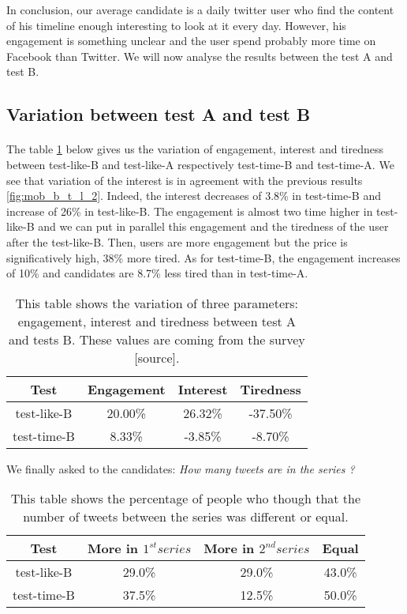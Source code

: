 In conclusion, our average candidate is a daily twitter user who find the content of his timeline enough interesting to look at it every day. However, his engagement is something unclear and the user spend probably more time on Facebook than Twitter. We will now analyse the results between the test A and test B.


\subsection{Variation between test A and test B}

\paragraph{}
The table \ref{tab:surv_var}  below gives us the variation of engagement, interest and tiredness between test-like-B and test-like-A respectively test-time-B and test-time-A. We see that variation of the interest is in agreement with the previous results \ref{fig:mob_b_t_l_2}. Indeed, the interest decreases of 3.8\% in test-time-B and increase of 26\% in test-like-B. The engagement is almost two time higher in test-like-B and we can put in parallel this engagement and the tiredness of the user after the test-like-B. Then, users are more engagement but the price is significatively high, 38\% more tired. As for test-time-B, the engagement increases of 10\% and candidates are 8.7\% less tired than in test-time-A.

\begin{table}[h]
\centering
\begin{tabular}{cccc}
\toprule
Test & Engagement & Interest & Tiredness \\ 
\midrule
test-like-B & 20.00\% & 26.32\% & -37.50\% \\
test-time-B & 8.33\% & -3.85\% & -8.70\%\\
\bottomrule 
\end{tabular}
\caption[Survey - variation]{This table shows the variation of three parameters: engagement, interest and tiredness between test A and tests B. These values are coming from the survey  [source]. }
\label{tab:surv_var}
\end{table}

We finally asked to the candidates: \textit{How many tweets are in the series ?}\\ 

\begin{table}[h]
\centering
\begin{tabular}{cccc}
\toprule
Test & More in $1^{st} series$ & More in $2^{nd} series$ & Equal \\ 
\midrule
test-like-B & 29.0\% & 29.0\% & 43.0\% \\
test-time-B & 37.5\% & 12.5\% & 50.0\%\\
\bottomrule 
\end{tabular}
\caption[Survey - number of tweets]{This table shows the percentage of people who though that the number of tweets between the series was different or equal.}
\label{tab:more_tweets}
\end{table}

